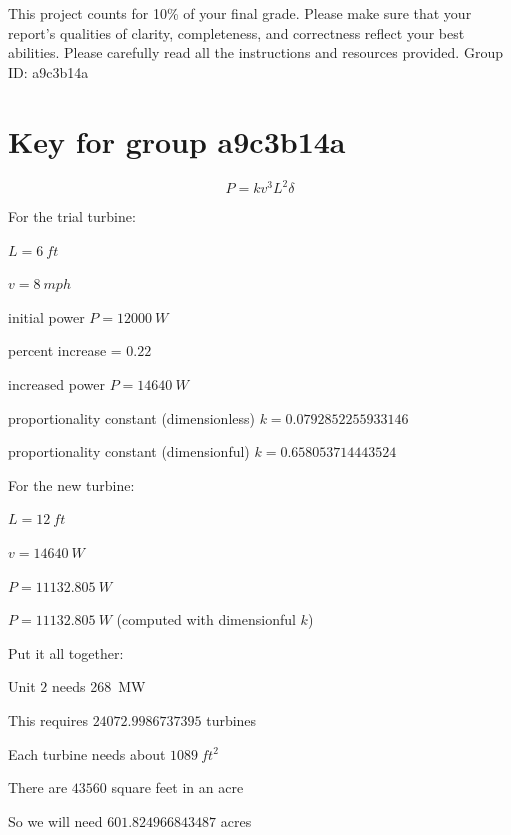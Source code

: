 \documentclass[11pt]{article}
\begin{document}
This project counts for 10\% of your final grade. Please make sure that
your report's qualities of clarity, completeness, and correctness
reflect your best abilities. Please carefully read all the instructions
and resources provided. \hfill Group ID: a9c3b14a


\newpage

\section*{Key for group a9c3b14a}

\begin{equation*}
  P = k v^3 L^2 \delta
\end{equation*}

For the trial turbine:

\begin{compactenum}
    \item $L = \SI{6}{ft}$
    \item $v = \SI{8}{mph}$
    \item initial power $P = \SI{12000}{W}$
    \item percent increase = $0.22$
    \item increased power $P = \SI{14640}{W}$
    \item proportionality constant (dimensionless) $k = 0.0792852255933146$
    \item proportionality constant (dimensionful) $k = 0.658053714443524$
\end{compactenum}

For the new turbine:

\begin{compactenum}
    \item $L = \SI{12}{ft}$
    \item $v = \SI{14640}{W}$
    \item $P = \SI{11132.805}{W}$
    \item $P = \SI{11132.805}{W}$ (computed with dimensionful $k$)
\end{compactenum}

Put it all together:

\begin{compactenum}
    \item Unit $2$ needs \SI{268}{MW}
    \item This requires $24072.9986737395$ turbines
    \item Each turbine needs about $\SI{1089}{ft^2}$
    \item There are $43560$ square feet in an acre
    \item So we will need $601.824966843487$ acres
\end{compactenum}

\end{document}
